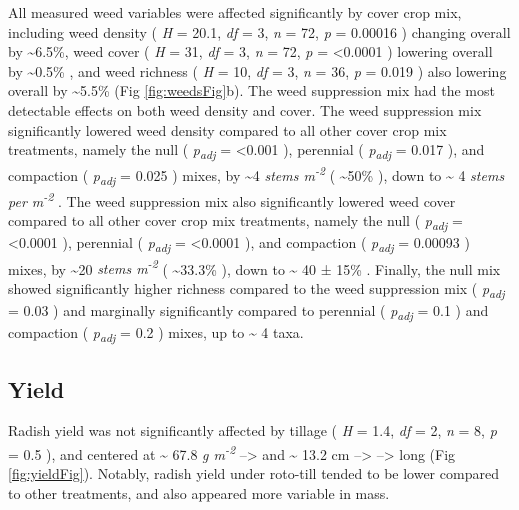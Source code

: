 \documentclass[
  12pt,
]{article}
\begin{document}
All measured weed variables were affected significantly by cover crop mix, including
weed density (
\emph{H} = 20.1,
\emph{df} = 3,
\emph{n} = 72,
\emph{p} = 0.00016
) changing overall by
\textasciitilde6.5\%,
weed cover (
\emph{H} = 31,
\emph{df} = 3,
\emph{n} = 72,
\emph{p} = \textless0.0001
) lowering overall by
\textasciitilde0.5\%
, and
weed richness (
\emph{H} = 10,
\emph{df} = 3,
\emph{n} = 36,
\emph{p} = 0.019
) also lowering overall by
\textasciitilde5.5\%
(Fig \ref{fig:weedsFig}b).
The weed suppression mix had the most detectable effects on both weed density and cover.
The weed suppression mix significantly lowered weed density compared to all other cover crop mix treatments, namely the null (
\emph{p\textsubscript{adj}} = \textless0.001
), perennial (
\emph{p\textsubscript{adj}} = 0.017
), and compaction (
\emph{p\textsubscript{adj}} = 0.025
) mixes, by
\textasciitilde4 \emph{stems m\textsuperscript{-2}} (
\textasciitilde50\%
), down to
\textasciitilde{} 4
\emph{stems per m\textsuperscript{-2}}
.
The weed suppression mix also significantly lowered weed cover compared to all other cover crop mix treatments, namely the null (
\emph{p\textsubscript{adj}} = \textless0.0001
), perennial (
\emph{p\textsubscript{adj}} = \textless0.0001
), and compaction (
\emph{p\textsubscript{adj}} = 0.00093
) mixes, by
\textasciitilde20 \emph{stems m\textsuperscript{-2}} (
\textasciitilde33.3\%
), down to
\textasciitilde{} 40 ±
15\%
.
Finally, the null mix showed significantly higher richness compared to the weed suppression mix (
\emph{p\textsubscript{adj}} = 0.03
) and marginally significantly compared to perennial (
\emph{p\textsubscript{adj}} = 0.1
) and compaction (
\emph{p\textsubscript{adj}} = 0.2
) mixes,
up to
\textasciitilde{} 4
taxa.

\hypertarget{yield}{%
\subsection{Yield}\label{yield}}

Radish yield was not significantly affected by tillage (
\emph{H} = 1.4,
\emph{df} = 2,
\emph{n} = 8,
\emph{p} = 0.5
), and centered at
\textasciitilde{} 67.8
\emph{g m\textsuperscript{-2}}
--\textgreater{}
and
\textasciitilde{} 13.2 cm
--\textgreater{}
--\textgreater{}
long (Fig \ref{fig:yieldFig}).
Notably, radish yield under roto-till tended to be lower compared to other treatments, and also appeared more variable in mass.
\end{document}
